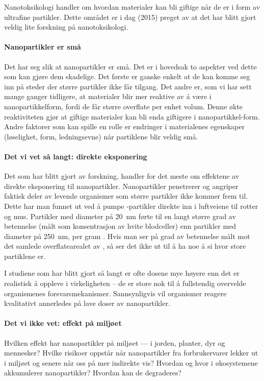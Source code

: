 Nanotoksikologi handler om hvordan materialer kan bli giftige når de er i form av ultrafine partikler. Dette området er i dag (2015) preget av at det har blitt gjort veldig lite forskning på nanotoksikologi.

\paragraph{Nanopartikler er små} Det har seg slik at nanopartikler er små. Det er i hovedsak to aspekter ved dette som kan gjøre dem skadelige. Det første er ganske enkelt at de kan komme seg inn på steder der større partikler ikke får tilgang. Det andre er, som vi har sett mange ganger tidligere, at materialer blir mer reaktive av å være i nanopartikkelform, fordi de får større overflate per enhet volum. Denne økte reaktiviteten gjør at giftige materialer kan bli enda giftigere i nanopartikkel-form. Andre faktorer som kan spille en rolle er endringer i materialenes egenskaper (løselighet, form, ledningsevne) når partiklene blir veldig små.

\paragraph{Det vi vet så langt: direkte eksponering} Det som har blitt gjort av forskning, handler for det meste om effektene av direkte eksponering til nanopartikler. Nanopartikler penetrerer og angriper faktisk deler av levende organismer som større partikler ikke kommer frem til. Dette har man funnet ut ved å pumpe -partikler direkte inn i luftveiene til rotter og mus. Partikler med diameter på \SI{20}{\nano\meter} førte til en langt større grad av betennelse (målt som konsentrasjon av hvite blodceller) enn partikler med diameter på \SI{250}{\nano\meter}, per gram . Hvis man ser på grad av betennelse målt mot det samlede overflatearealet av , så ser det ikke ut til å ha noe å si hvor store partiklene er.

I studiene som har blitt gjort så langt er ofte dosene mye høyere enn det er realistisk å oppleve i virkeligheten -- de er store nok til å fullstendig overvelde organismenes forsvarsmekanismer. Sannsynligvis vil organismer reagere kvalitativt annerledes på lave doser av nanopartikler.

\paragraph{Det vi ikke vet: effekt på miljøet} Hvilken effekt har nanopartikler på miljøet --- i jorden, planter, dyr og mennesker? Hvilke risikoer oppstår når nanopartikler fra forbrukervarer lekker ut i miljøet og senere når oss på mer indirekte vis? Hvordan og hvor i økosystemene akkumulerer nanopartikler? Hvordan kan de degraderes?

